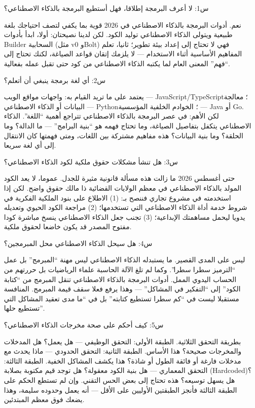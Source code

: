 
س1: لا أعرف البرمجة إطلاقا، فهل أستطيع البرمجة بالذكاء الاصطناعي؟

نعم. أدوات البرمجة بالذكاء الاصطناعي في 2026 قوية بما يكفي لتصف احتياجك بلغة طبيعية ويتولى الذكاء الاصطناعي توليد الكود. لكن لدينا نصيحتان: أولا، ابدأ بأدوات Builder السحابية (مثل v0 وBolt) فهي لا تحتاج إلى إعداد بيئة تطوير؛ ثانيا، تعلم المفاهيم الأساسية أثناء الاستخدام — لا يلزمك إتقان قواعد الصياغة، لكنك تحتاج إلى “فهم” المعنى العام لما يكتبه الذكاء الاصطناعي من كود حتى تقبل عمله بفعالية.

س2: أي لغة برمجة ينبغي أن أتعلم؟

يعتمد على ما تريد القيام به: واجهات مواقع الويب — JavaScript/TypeScript؛ معالجة البيانات أو الذكاء الاصطناعي — Python؛ الخوادم الخلفية المؤسسية — Java أو Go. لكن الأهم: في عصر البرمجة بالذكاء الاصطناعي تتراجع أهمية “اللغة”. الذكاء الاصطناعي يتكفل بتفاصيل الصياغة، وما تحتاج فهمه هو “بنية البرامج” — ما الدالة؟ وما الحلقة؟ وما بنية البيانات؟ هذه مفاهيم مشتركة بين اللغات، ومتى فهمتها كان الانتقال إلى أي لغة سريعا.

س3: هل تنشأ مشكلات حقوق ملكية لكود الذكاء الاصطناعي؟

حتى أغسطس 2026 ما زالت هذه مسألة قانونية مثيرة للجدل. عموما، لا يعد الكود المولد بالذكاء الاصطناعي في معظم الولايات القضائية ذا مالك حقوق واضح. لكن إذا استخدمته في مشروع تجاري فننصح بـ: (1) الاطلاع على بنود الملكية الفكرية في شروط خدمة أداة الذكاء الاصطناعي التي تستخدمها؛ (2) مراجعة الكود الحيوي وتعديله يدويا ليحمل مساهمتك الإبداعية؛ (3) تجنب جعل الذكاء الاصطناعي ينسخ مباشرة كودا مفتوح المصدر قد يكون خاضعا لحقوق ملكية.

س4: هل سيحل الذكاء الاصطناعي محل المبرمجين؟

ليس على المدى القصير. ما يستبدله الذكاء الاصطناعي ليس مهنة “المبرمج” بل عمل “الترميز سطرا سطرا”. وكما لم تلغ الآلة الحاسبة علماء الرياضيات بل حررتهم من الحساب اليدوي الممل. أدوات البرمجة بالذكاء الاصطناعي تنقل المبرمج من “كتابة الكود” إلى “التفكير في المشاكل” — وهذا يرفع فعلا سقف قيمة المبرمج. المنافسة مستقبلا ليست في “كم سطرا تستطيع كتابته” بل في “ما مدى تعقيد المشاكل التي تستطيع حلها”.

س5: كيف أحكم على صحة مخرجات الذكاء الاصطناعي؟

بطريقة التحقق الثلاثية. الطبقة الأولى: التحقق الوظيفي — هل يعمل؟ هل المدخلات والمخرجات صحيحة؟ هذا الأساس. الطبقة الثانية: التحقق الحدودي — ماذا يحدث مع مدخلات فارغة أو فائقة الطول أو شاذة؟ هذا يكشف المشاكل الخفية. الطبقة الثالثة: التحقق المعماري — هل بنية الكود معقولة؟ هل توجد قيم مكتوبة بصلابة (Hardcoded)؟ هل يسهل توسيعه؟ هذه تحتاج إلى بعض الحس التقني. وإن لم تستطع الحكم على الطبقة الثالثة فأنجز الطبقتين الأوليين على الأقل — أنه يعمل وحدوده سليمة، وهذا يضعك فوق معظم المبتدئين.

